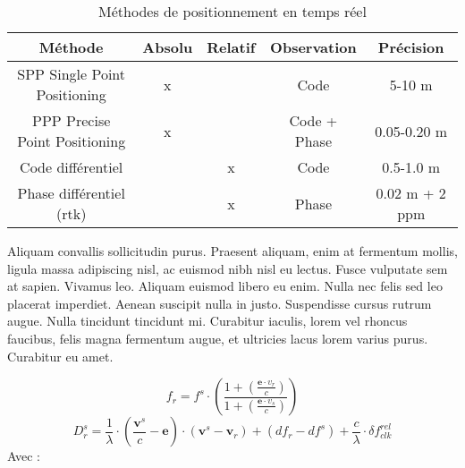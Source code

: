 \begin{table}
    \begin{tabular}{c|c|c|c|c}
        \toprule
        Méthode                       & Absolu & Relatif & Observation  & Précision \\
        \midrule
        SPP Single Point Positioning  & x      &         & Code         & 5-10 m  \\
        PPP Precise Point Positioning & x      &         & Code + Phase & 0.05-0.20 m  \\
        Code différentiel             &        & x       & Code         & 0.5-1.0 m  \\
        Phase différentiel (\acrshort{rtk})      &        & x       & Phase        & 0.02 m + 2 ppm  \\
        \bottomrule
    \end{tabular}
    \caption{Méthodes de positionnement en temps réel}
    \label{tab:Positionnement temps réel} 
\end{table}

Aliquam convallis sollicitudin purus. Praesent aliquam, enim at fermentum mollis, ligula massa adipiscing nisl, ac euismod nibh nisl eu lectus. Fusce vulputate sem at sapien. Vivamus leo. Aliquam euismod libero eu enim. Nulla nec felis sed leo placerat imperdiet. Aenean suscipit nulla in justo. Suspendisse cursus rutrum augue. Nulla tincidunt tincidunt mi. Curabitur iaculis, lorem vel rhoncus faucibus, felis magna fermentum augue, et ultricies lacus lorem varius purus. Curabitur eu amet.

\begin{equation}
    f_r = f^s \cdot \left(\frac{1+ \left(\frac{\mathbf{e}\cdot v_r}{c}\right)}{1+ \left(\frac{\mathbf{e}\cdot v_s}{c}\right)}\right)
\end{equation}
\begin{equation}
    D_r^s = \frac{1}{\lambda} \cdot \left(\frac{\mathbf{v}^s}{c}-\mathbf{e}\right) \cdot (\mathbf{v}^s -\mathbf{v}_r) + ({df}_r - {df}^s) + \frac{c}{\lambda} \cdot \delta f_{clk}^{rel}
\end{equation}
Avec :



